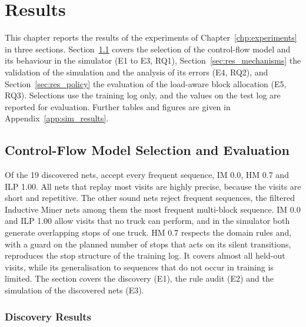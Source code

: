 \chapter{Results}
\label{chp:results}

This chapter reports the results of the experiments of
Chapter~\ref{chp:experiments} in three sections.
Section~\ref{sec:res_part_controlflow} covers the selection of the control-flow model
and its behaviour in the simulator (E1 to E3, RQ1), Section~\ref{sec:res_mechanisms}
the validation of the simulation and the analysis of its errors (E4, RQ2), and
Section~\ref{sec:res_policy} the evaluation of the load-aware block allocation (E5,
RQ3). Selections use the training log only, and the
values on the test log are reported for evaluation. Further tables and figures are
given in Appendix~\ref{app:sim_results}.

\section{Control-Flow Model Selection and Evaluation}
\label{sec:res_part_controlflow}

Of the 19 discovered nets,  accept every frequent sequence, IM
0.0, HM 0.7 and ILP 1.00. All nets that replay most visits are highly precise,
because the visits are short and repetitive. The other sound nets reject frequent
sequences, the filtered Inductive Miner nets among them the most frequent
multi-block sequence. IM 0.0 and ILP 1.00 allow visits that no truck can perform,
and in the simulator both generate overlapping stops of one truck. HM 0.7 respects
the domain rules and, with a guard on the planned number of stops that acts on its
silent transitions, reproduces the stop structure of the training log. It covers
almost all held-out visits, while its generalisation to sequences that do not occur
in training is limited. The section covers the discovery (E1), the rule audit (E2)
and the simulation of the discovered nets (E3).

\subsection{Discovery Results}
\label{sec:res_discovery}

